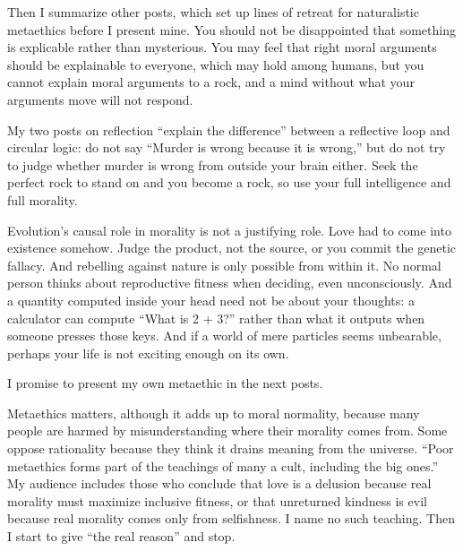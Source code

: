 Then I summarize other posts, which set up lines of retreat for naturalistic metaethics before I present mine. You should not be disappointed that something is explicable rather than mysterious. You may feel that right moral arguments should be explainable to everyone, which may hold among humans, but you cannot explain moral arguments to a rock, and a mind without what your arguments move will not respond.

My two posts on reflection ``explain the difference'' between a reflective loop and circular logic: do not say ``Murder is wrong because it is wrong,'' but do not try to judge whether murder is wrong from outside your brain either. Seek the perfect rock to stand on and you become a rock, so use your full intelligence and full morality.

Evolution's causal role in morality is not a justifying role. Love had to come into existence somehow. Judge the product, not the source, or you commit the genetic fallacy. And rebelling against nature is only possible from within it. No normal person thinks about reproductive fitness when deciding, even unconsciously. And a quantity computed inside your head need not be about your thoughts: a calculator can compute ``What is 2 + 3?'' rather than what it outputs when someone presses those keys. And if a world of mere particles seems unbearable, perhaps your life is not exciting enough on its own. 

I promise to present my own metaethic in the next posts. 

Metaethics matters, although it adds up to moral normality, because many people are harmed by misunderstanding where their morality comes from. Some oppose rationality because they think it drains meaning from the universe. ``Poor metaethics forms part of the teachings of many a cult, including the big ones.'' My audience includes those who conclude that love is a delusion because real morality must maximize inclusive fitness, or that unreturned kindness is evil because real morality comes only from selfishness. I name no such teaching. Then I start to give ``the real reason'' and stop.
